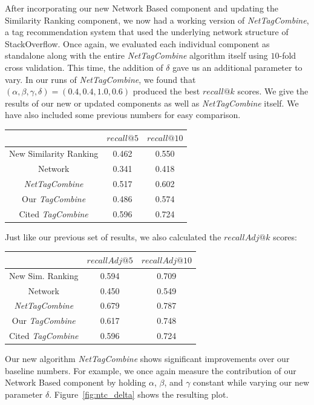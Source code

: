 \documentclass[10pt]{IEEEtran}
\begin{document}
After incorporating our new Network Based component and updating the Similarity Ranking component, we now had a working version of \textit{NetTagCombine}, a tag recommendation system that used the underlying network structure of StackOverflow. Once again, we evaluated each individual component as standalone along with the entire \textit{NetTagCombine} algorithm itself using $10$-fold cross validation. This time, the addition of $\delta$ gave us an additional parameter to vary. In our runs of \textit{NetTagCombine}, we found that $(\alpha, \beta, \gamma, \delta) = (0.4, 0.4, 1.0, 0.6)$ produced the best $recall@k$ scores. We give the results of our new or updated components as well as \textit{NetTagCombine} itself. We have also included some previous numbers for easy comparison.
\begin{center}\begin{tabular}{c||c|c}
& $recall@5$ & $recall@10$\\ \hline\hline
New Similarity Ranking & 0.462 & 0.550\\ \hline
Network & 0.341 & 0.418\\ \hline\hline
\textit{NetTagCombine} & 0.517 & 0.602\\ \hline\hline
Our \textit{TagCombine} & 0.486 & 0.574\\ \hline
\cite{1} Cited \textit{TagCombine} & 0.596 & 0.724\\
\end{tabular}\end{center}
Just like our previous set of results, we also calculated the $recallAdj@k$ scores:
\begin{center}\begin{tabular}{c||c|c}
& $recallAdj@5$ & $recallAdj@10$\\ \hline\hline
New Sim. Ranking & 0.594 & 0.709\\ \hline
Network & 0.450 & 0.549\\ \hline\hline
\textit{NetTagCombine} & 0.679 & 0.787\\ \hline\hline
Our \textit{TagCombine} & 0.617 & 0.748\\ \hline
Cited \textit{TagCombine} & 0.596 & 0.724\\
\end{tabular}\end{center}
Our new algorithm \textit{NetTagCombine} shows significant improvements over our baseline numbers. For example, we once again measure the contribution of our Network Based component by holding $\alpha$, $\beta$, and $\gamma$ constant while varying our new parameter $\delta$. Figure~\ref{fig:ntc_delta} shows the resulting plot.
\end{document}
